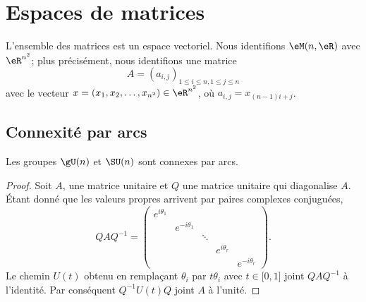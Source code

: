 
\section{Espaces de matrices}

L'ensemble des matrices est un espace vectoriel. Nous identifions $\eM(n,\eR)$ avec $ \eR^{n^2}$; plus précisément, nous identifions une matrice 
\begin{equation}
    A = (a_{i,j})_{1\leq i \leq n, 1 \leq j \leq n}
\end{equation}
avec le vecteur $x = (x_1, x_2, \dots, x_{n^2}) \in \eR^{n^2}$, où $ a_{i,j} = x_{(n-1)i + j}$. 

\subsection{Connexité par arcs}

\begin{lemma}
    Les groupes \( \gU(n)\) et \( \SU(n)\) sont connexes par arcs.
\end{lemma}

\begin{proof}
    Soit \( A\), une matrice unitaire et \( Q\) une matrice unitaire qui diagonalise \( A\). Étant donné que les valeurs propres arrivent par paires complexes conjuguées,
    \begin{equation}
        QAQ^{-1}=\begin{pmatrix}
            e^{i\theta_1}    &       &       &       &   \\  
            &    e^{-i\theta_1}    &       &       &   \\  
            &       &    \ddots    &       &   \\  
            &       &       &    e^{i\theta_r}    &   \\  
            &       &       &       &        e^{-i\theta_r}
        \end{pmatrix}.
    \end{equation}
    Le chemin \( U(t)\) obtenu en remplaçant \( \theta_i\) par \( t\theta_i\) avec \( t\in\mathopen[ 0 , 1 \mathclose]\) joint \( QAQ^{-1}\) à l'identité. Par conséquent \( Q^{-1}U(t)Q\) joint \( A\) à l'unité.
\end{proof}

